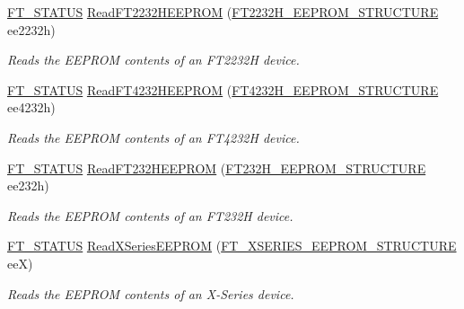\begin{DoxyCompactItemize}
\mbox{\hyperlink{class_f_t_d2_x_x___n_e_t_1_1_f_t_d_i_aabe20ad905cc4ccc1e35dd5b877d9a83}{F\+T\+\_\+\+S\+T\+A\+T\+US}} \mbox{\hyperlink{class_f_t_d2_x_x___n_e_t_1_1_f_t_d_i_ab8a4354ef365e048e1126cbe2e1fabbc}{Read\+F\+T2232\+H\+E\+E\+P\+R\+OM}} (\mbox{\hyperlink{class_f_t_d2_x_x___n_e_t_1_1_f_t_d_i_1_1_f_t2232_h___e_e_p_r_o_m___s_t_r_u_c_t_u_r_e}{F\+T2232\+H\+\_\+\+E\+E\+P\+R\+O\+M\+\_\+\+S\+T\+R\+U\+C\+T\+U\+RE}} ee2232h)
\begin{DoxyCompactList}\small\item\em Reads the E\+E\+P\+R\+OM contents of an F\+T2232H device. \end{DoxyCompactList}\item 
\mbox{\hyperlink{class_f_t_d2_x_x___n_e_t_1_1_f_t_d_i_aabe20ad905cc4ccc1e35dd5b877d9a83}{F\+T\+\_\+\+S\+T\+A\+T\+US}} \mbox{\hyperlink{class_f_t_d2_x_x___n_e_t_1_1_f_t_d_i_a0518fd358de256eeb84fc9a8f9280e76}{Read\+F\+T4232\+H\+E\+E\+P\+R\+OM}} (\mbox{\hyperlink{class_f_t_d2_x_x___n_e_t_1_1_f_t_d_i_1_1_f_t4232_h___e_e_p_r_o_m___s_t_r_u_c_t_u_r_e}{F\+T4232\+H\+\_\+\+E\+E\+P\+R\+O\+M\+\_\+\+S\+T\+R\+U\+C\+T\+U\+RE}} ee4232h)
\begin{DoxyCompactList}\small\item\em Reads the E\+E\+P\+R\+OM contents of an F\+T4232H device. \end{DoxyCompactList}\item 
\mbox{\hyperlink{class_f_t_d2_x_x___n_e_t_1_1_f_t_d_i_aabe20ad905cc4ccc1e35dd5b877d9a83}{F\+T\+\_\+\+S\+T\+A\+T\+US}} \mbox{\hyperlink{class_f_t_d2_x_x___n_e_t_1_1_f_t_d_i_aa0d6fbd8c14599a8b0904c8384dcdcfc}{Read\+F\+T232\+H\+E\+E\+P\+R\+OM}} (\mbox{\hyperlink{class_f_t_d2_x_x___n_e_t_1_1_f_t_d_i_1_1_f_t232_h___e_e_p_r_o_m___s_t_r_u_c_t_u_r_e}{F\+T232\+H\+\_\+\+E\+E\+P\+R\+O\+M\+\_\+\+S\+T\+R\+U\+C\+T\+U\+RE}} ee232h)
\begin{DoxyCompactList}\small\item\em Reads the E\+E\+P\+R\+OM contents of an F\+T232H device. \end{DoxyCompactList}\item 
\mbox{\hyperlink{class_f_t_d2_x_x___n_e_t_1_1_f_t_d_i_aabe20ad905cc4ccc1e35dd5b877d9a83}{F\+T\+\_\+\+S\+T\+A\+T\+US}} \mbox{\hyperlink{class_f_t_d2_x_x___n_e_t_1_1_f_t_d_i_afd2110e4367ed40d47ab60289ee99547}{Read\+X\+Series\+E\+E\+P\+R\+OM}} (\mbox{\hyperlink{class_f_t_d2_x_x___n_e_t_1_1_f_t_d_i_1_1_f_t___x_s_e_r_i_e_s___e_e_p_r_o_m___s_t_r_u_c_t_u_r_e}{F\+T\+\_\+\+X\+S\+E\+R\+I\+E\+S\+\_\+\+E\+E\+P\+R\+O\+M\+\_\+\+S\+T\+R\+U\+C\+T\+U\+RE}} eeX)
\begin{DoxyCompactList}\small\item\em Reads the E\+E\+P\+R\+OM contents of an X-\/\+Series device. \end{DoxyCompactList}\item 

\end{DoxyCompactItemize}

